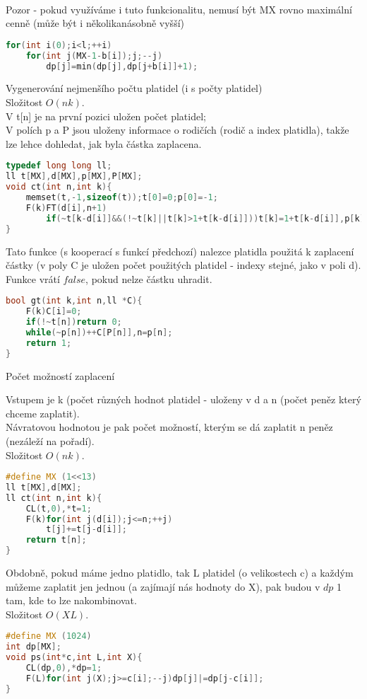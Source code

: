 \documentclass[11pt]{article}
\begin{document}
\\Pozor - pokud využíváme i tuto funkcionalitu, nemusí být \textsf{MX} rovno maximální cenně (může být i několikanásobně vyšší)
\begin{lstlisting}[language=C++]
for(int i(0);i<l;++i)
    for(int j(MX-1-b[i]);j;--j)
        dp[j]=min(dp[j],dp[j+b[i]]+1);
\end{lstlisting}
Vygenerování nejmenšího počtu platidel (i s počty platidel)
\\Složitost $O(nk)$.
\\V t[n] je na první pozici uložen počet platidel;
\\V polích \textsf{p} a \textsf{P} jsou uloženy informace o rodičích (rodič a index platidla), takže lze lehce dohledat, jak byla částka zaplacena.
\begin{lstlisting}[language=C++]
typedef long long ll;
ll t[MX],d[MX],p[MX],P[MX];
void ct(int n,int k){
    memset(t,-1,sizeof(t));t[0]=0;p[0]=-1;
    F(k)FT(d[i],n+1)
        if(~t[k-d[i]]&&(!~t[k]||t[k]>1+t[k-d[i]]))t[k]=1+t[k-d[i]],p[k]=k-d[i],P[k]=i;
}
\end{lstlisting}
Tato funkce (s kooperací s funkcí předchozí) nalezce platidla použitá k zaplacení částky (v poly \textsf{C} je uložen počet použitých platidel - indexy stejné, jako v poli \textsf{d}).
\\Funkce vrátí $false$, pokud nelze částku uhradit.
\begin{lstlisting}[language=C++]
bool gt(int k,int n,ll *C){
    F(k)C[i]=0;
    if(!~t[n])return 0;
    while(~p[n])++C[P[n]],n=p[n];
    return 1;
}

\end{lstlisting}
\begin{center}
Počet možností zaplacení
\end{center}
Vstupem je \textsf{k} (počet různých hodnot platidel - uloženy v \textsf{d} a \textsf{n} (počet peněz který chceme zaplatit).
\\Návratovou hodnotou je pak počet možností, kterým se dá zaplatit \textsf{n} peněz (nezáleží na pořadí).
\\Složitost $O(nk)$.
\begin{lstlisting}[language=C++]
#define MX (1<<13)
ll t[MX],d[MX];
ll ct(int n,int k){
    CL(t,0),*t=1;
    F(k)for(int j(d[i]);j<=n;++j)
        t[j]+=t[j-d[i]];
    return t[n];
}
\end{lstlisting}
Obdobně, pokud máme jedno platidlo, tak \textsf{L} platidel (o velikostech \textsf{c}) a každým můžeme zaplatit jen jednou (a zajímají nás hodnoty do \textsf{X}), pak budou v $dp$ 1 tam, kde to lze nakombinovat.
\\Složitost $O(XL)$.
\begin{lstlisting}[language=C++]
#define MX (1024)
int dp[MX];
void ps(int*c,int L,int X){
    CL(dp,0),*dp=1;
    F(L)for(int j(X);j>=c[i];--j)dp[j]|=dp[j-c[i]];
}
\end{lstlisting}
\end{document}
